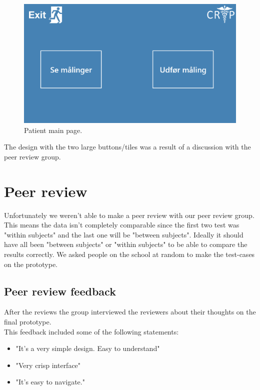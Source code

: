 \begin{figure}[H]
\centering
\includegraphics[width=.7\textwidth]{billeder/usermainpage_hifi.png}
\caption{Patient main page.}
\end{figure}

The design with the two large buttons/tiles was a result of a discussion with the peer review group.\\

\section{Peer review}
Unfortunately we weren't able to make a peer review with our peer review group. This means the data isn't completely comparable since the first two test was "within subjects" and the last one will be "between subjects". Ideally it should have all been "between subjects" or "within subjects" to be able to compare the results correctly. We asked people on the school at random to make the test-cases on the prototype.
\subsection{Peer review feedback}
After the reviews the group interviewed the reviewers about their thoughts on the final prototype.\\
This feedback included some of the following statements:
\begin{itemize}
\item "It's a very simple design. Easy to understand"
\item "Very crisp interface"
\item "It's easy to navigate."
\end{itemize}

